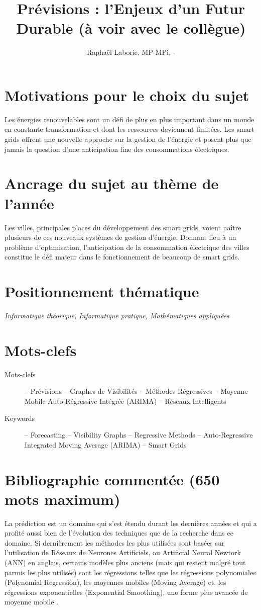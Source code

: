 \documentclass[12pt,a4paper]{article}
\title{Prévisions : l'Enjeux d'un Futur Durable (à voir avec le collègue)}
\author{Raphaël Laborie, MP\oldstylenums{1}-MPi, \oldstylenums{\the\year}-\oldstylenums{\arabic{nextyear}} }
\newcommand{\positionnementThematique}[1]{
\section*{Positionnement thématique}
{\it #1}}
\newcommand{\motclefs}[2]{
    \section*{Mots-clefs}
        \begin{description}
            \item[Mots-clefs] -- #1 
            \item[Keywords]   -- #2
        \end{description}
}
\begin{document}
\maketitle
\section*{Motivations pour le choix du sujet}
Les énergies renouvelables sont un défi de plus en plus important dans un monde en constante transformation et dont les ressources deviennent limitées.
Les smart grids offrent une nouvelle approche sur la gestion de l'énergie et posent plus que jamais la question d'une anticipation fine des consommations électriques.
\section*{Ancrage du sujet au thème de l'année}
Les villes, principales places du développement des smart grids, voient naître plusieurs de ces nouveaux systèmes de gestion d'énergie. Donnant lieu à un problème d'optimisation, l'anticipation de la consommation électrique des villes constitue le défi majeur dans le fonctionnement de beaucoup de smart grids.
\positionnementThematique{Informatique théorique, Informatique pratique, Mathématiques appliquées}
\motclefs{Prévisions -- Graphes de Visibilités -- Méthodes Régressives -- Moyenne Mobile Auto-Régressive Intégrée (ARIMA) -- Réseaux Intelligents}{Forecasting -- Visibility Graphs -- Regressive Methods -- Auto-Regressive Integrated Moving Average (ARIMA) -- Smart Grids}
\section*{Bibliographie commentée (650 mots maximum)}

La prédiction est un domaine qui s'est étendu durant les dernières années et qui a profité aussi bien de l'évolution des techniques que de la recherche dans ce domaine. Si dernièrement les méthodes les plus utilisées sont basées sur l'utilisation de Réseaux de Neurones Artificiels, ou Artificial Neural Newtork (ANN) en anglais, certains modèles plus anciens (mais qui restent malgré tout parmis les plus utilisés) sont les régressions telles que les régressions polynomiales \cite{polyregrEva} (Polynomial Regression), les moyennes mobiles (Moving Average) et, les régressions exponentielles (Exponential Smoothing), une forme plus avancée de moyenne mobile \cite{exporeview}.
\end{document}
